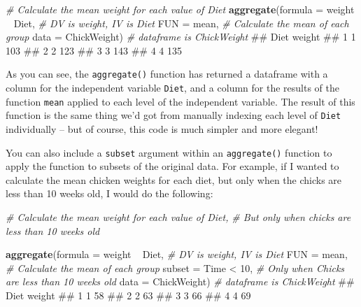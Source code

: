 \documentclass[]{book}
\newenvironment{Shaded}{\begin{snugshade}}{\end{snugshade}}
\newcommand{\KeywordTok}[1]{\textcolor[rgb]{0.13,0.29,0.53}{\textbf{{#1}}}}
\newcommand{\DataTypeTok}[1]{\textcolor[rgb]{0.13,0.29,0.53}{{#1}}}
\newcommand{\DecValTok}[1]{\textcolor[rgb]{0.00,0.00,0.81}{{#1}}}
\newcommand{\StringTok}[1]{\textcolor[rgb]{0.31,0.60,0.02}{{#1}}}
\newcommand{\CommentTok}[1]{\textcolor[rgb]{0.56,0.35,0.01}{\textit{{#1}}}}
\newcommand{\NormalTok}[1]{{#1}}
\theoremstyle{definition}
\theoremstyle{definition}
\theoremstyle{remark}
\begin{document}
\begin{Shaded}
\begin{Highlighting}[]
\CommentTok{# Calculate the mean weight for each value of Diet}
\KeywordTok{aggregate}\NormalTok{(}\DataTypeTok{formula =} \NormalTok{weight ~}\StringTok{ }\NormalTok{Diet,  }\CommentTok{# DV is weight, IV is Diet}
          \DataTypeTok{FUN =} \NormalTok{mean,               }\CommentTok{# Calculate the mean of each group}
          \DataTypeTok{data =} \NormalTok{ChickWeight)       }\CommentTok{# dataframe is ChickWeight}
\NormalTok{##   Diet weight}
\NormalTok{## 1    1    103}
\NormalTok{## 2    2    123}
\NormalTok{## 3    3    143}
\NormalTok{## 4    4    135}
\end{Highlighting}
\end{Shaded}

As you can see, the \texttt{aggregate()} function has returned a
dataframe with a column for the independent variable \texttt{Diet}, and
a column for the results of the function \texttt{mean} applied to each
level of the independent variable. The result of this function is the
same thing we'd got from manually indexing each level of \texttt{Diet}
individually -- but of course, this code is much simpler and more
elegant!

You can also include a \texttt{subset} argument within an
\texttt{aggregate()} function to apply the function to subsets of the
original data. For example, if I wanted to calculate the mean chicken
weights for each diet, but only when the chicks are less than 10 weeks
old, I would do the following:

\begin{Shaded}
\begin{Highlighting}[]
\CommentTok{# Calculate the mean weight for each value of Diet,}
\CommentTok{#  But only when chicks are less than 10 weeks old}

\KeywordTok{aggregate}\NormalTok{(}\DataTypeTok{formula =} \NormalTok{weight ~}\StringTok{ }\NormalTok{Diet,  }\CommentTok{# DV is weight, IV is Diet}
          \DataTypeTok{FUN =} \NormalTok{mean,               }\CommentTok{# Calculate the mean of each group}
          \DataTypeTok{subset =} \NormalTok{Time <}\StringTok{ }\DecValTok{10}\NormalTok{,       }\CommentTok{# Only when Chicks are less than 10 weeks old}
          \DataTypeTok{data =} \NormalTok{ChickWeight)       }\CommentTok{# dataframe is ChickWeight}
\NormalTok{##   Diet weight}
\NormalTok{## 1    1     58}
\NormalTok{## 2    2     63}
\NormalTok{## 3    3     66}
\NormalTok{## 4    4     69}
\end{Highlighting}
\end{Shaded}
\end{document}

